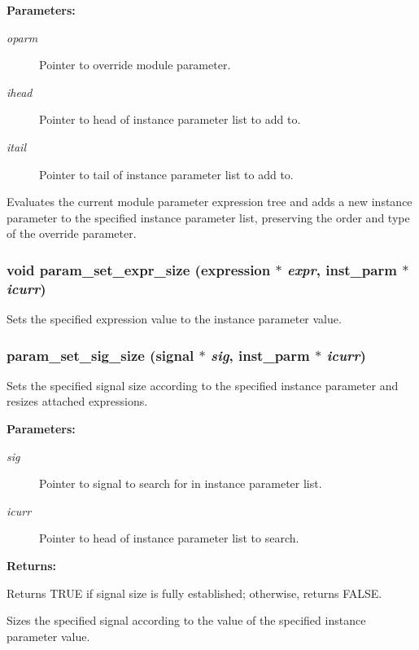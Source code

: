 \begin{Desc}
\item[{\bf Parameters: }]\par
\begin{description}
\item[
{\em oparm}]Pointer to override module parameter. \item[
{\em ihead}]Pointer to head of instance parameter list to add to. \item[
{\em itail}]Pointer to tail of instance parameter list to add to.

\end{description}
\end{Desc}
Evaluates the current module parameter expression tree and adds a new instance parameter to the specified instance parameter list, preserving the order and type of the override parameter. 
\subsubsection{\setlength{\rightskip}{0pt plus 5cm}void param\_\-set\_\-expr\_\-size ({\bf expression} $\ast$ {\em expr}, {\bf inst\_\-parm} $\ast$ {\em icurr})}\label{param_8h_a8}


Sets the specified expression value to the instance parameter value.

\subsubsection{ param\_\-set\_\-sig\_\-size ({\bf signal} $\ast$ {\em sig}, {\bf inst\_\-parm} $\ast$ {\em icurr})}\label{param_8h_a9}


Sets the specified signal size according to the specified instance parameter and resizes attached expressions.

\begin{Desc}
\item[{\bf Parameters: }]\par
\begin{description}
\item[
{\em sig}]Pointer to signal to search for in instance parameter list. \item[
{\em icurr}]Pointer to head of instance parameter list to search.

\end{description}
\end{Desc}
\begin{Desc}
\item[{\bf Returns: }]\par
Returns TRUE if signal size is fully established; otherwise, returns FALSE.

\end{Desc}
Sizes the specified signal according to the value of the specified instance parameter value. 